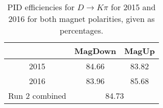 \documentclass{article}
\begin{document}
\begin{table}[H]
    \centering
    \begin{tabular}{ccc}
        \toprule
        & MagDown & MagUp \\
        \midrule
        2015 & 84.66 & 83.82 \\
        2016 & 83.96 & 85.68 \\
        \midrule
        Run 2 combined & \multicolumn{2}{c}{84.73} \\
        \bottomrule
    \end{tabular}
    \caption{PID efficiencies for $D \to K\pi$ for 2015 and 2016 for both magnet polarities, given as percentages.}
\label{tab:PID_efficiency_Kpi}
\end{table}
\end{document}

